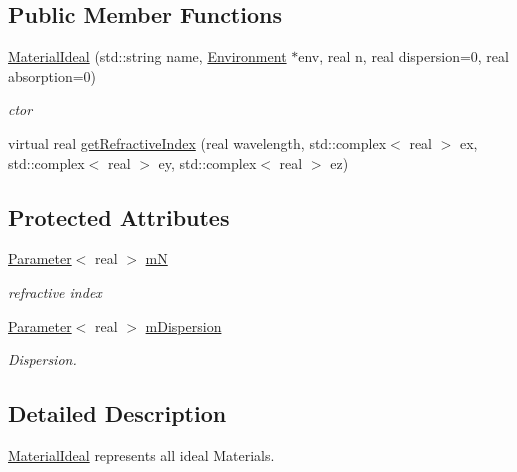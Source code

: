 \subsection*{Public Member Functions}
\begin{DoxyCompactItemize}
\item 
\hyperlink{classMaterialIdeal_a81f6c27aef2251e7d810fa4d9521d9e4}{Material\+Ideal} (std\+::string name, \hyperlink{classEnvironment}{Environment} $\ast$env, real n, real dispersion=0, real absorption=0)
\begin{DoxyCompactList}\small\item\em ctor \end{DoxyCompactList}\item 
virtual real \hyperlink{classMaterialIdeal_a21833d3f466424ee62ee70e02de1ee49}{get\+Refractive\+Index} (real wavelength, std\+::complex$<$ real $>$ ex, std\+::complex$<$ real $>$ ey, std\+::complex$<$ real $>$ ez)
\end{DoxyCompactItemize}
\subsection*{Protected Attributes}
\begin{DoxyCompactItemize}
\item 
\hyperlink{classParameter}{Parameter}$<$ real $>$ \hyperlink{classMaterialIdeal_aa2a06bb4e433a2c039714e85f5e777c1}{mN}\hypertarget{classMaterialIdeal_aa2a06bb4e433a2c039714e85f5e777c1}{}\label{classMaterialIdeal_aa2a06bb4e433a2c039714e85f5e777c1}

\begin{DoxyCompactList}\small\item\em refractive index \end{DoxyCompactList}\item 
\hyperlink{classParameter}{Parameter}$<$ real $>$ \hyperlink{classMaterialIdeal_a1e1974c42234bddf7c7e2ba52cf316a0}{m\+Dispersion}\hypertarget{classMaterialIdeal_a1e1974c42234bddf7c7e2ba52cf316a0}{}\label{classMaterialIdeal_a1e1974c42234bddf7c7e2ba52cf316a0}

\begin{DoxyCompactList}\small\item\em Dispersion. \end{DoxyCompactList}\end{DoxyCompactItemize}


\subsection{Detailed Description}
\hyperlink{classMaterialIdeal}{Material\+Ideal} represents all ideal Materials. 


